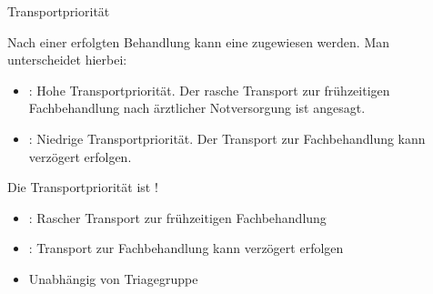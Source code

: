 \TextSlide
{Transportpriorität}
{%
\label{topic:transportprioritaet}
Nach einer erfolgten Behandlung kann eine  
zugewiesen werden. 
Man unterscheidet hierbei: 

\begin{itemize}
  \item {}: Hohe Transportpriorität. 
  Der rasche Transport zur
  frühzeitigen Fachbehandlung nach ärztlicher Notversorgung ist
  angesagt.
  \item {}: Niedrige Transportpriorität. 
  Der Transport zur Fachbehandlung
  kann verzögert erfolgen.
\end{itemize}
Die Transportpriorität ist ! 
}
{
\begin{itemize}
  \item {}: Rascher Transport zur
  frühzeitigen Fachbehandlung
  \item {}: Transport zur Fachbehandlung
  kann verzögert erfolgen
  \item Unabhängig von Triagegruppe
\end{itemize}
}
{}
{}
{}


